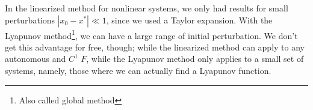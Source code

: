\documentclass{tufte-handout}
\newcommand*\R{\mathbb{R}}
\newtheorem{thm}{Theorem}[subsection]
\theoremstyle{definition}
\newtheorem{defn}[thm]{Definition}
\begin{document}
In the linearized method for nonlinear systems, we only had results for small perturbations $\left| x_0 - x^* \right| \ll 1$, since we used a Taylor expansion. With the Lyapunov method\footnote{Also called global method}, 
we can have a large range of initial perturbation.
We don't get this advantage for free, though; while the linearized method can apply to any autonomous and $C^1$ $F$, while the Lyapunov method only applies to a small set of systems, namely, those where we can actually find a Lyapunov function.

\end{document}
